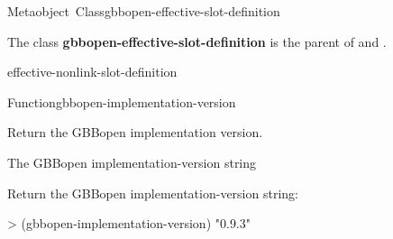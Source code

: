 \documentclass[10pt,twoside,english,pdftex]{article}
\begin{document}
\begin{functiondoc}{Metaobject~Class}{gbbopen-effective-slot-definition}{}
%

\fnsyntax

\fnpackage {}

\fnmodule {}

\fndescription The class \textbf{gbbopen-effective-slot-definition} is the
parent  of \textbf{} and
\textbf{}.
 
\begin{alsos}{effective-nonlink-slot-definition}
\end{alsos}

\end{functiondoc}


\begin{functiondoc}{Function}{gbbopen-implementation-version}{\noargs{}
    \returns{} }
%
%

\fnsyntax

\fnpurpose Return the GBBopen implementation version.

\fnpackage {}

\fnmodule {}

\fnreturns The GBBopen implementation-version string

\fnexample
Return the GBBopen implementation-version string:
%
\W\supp
\begin{example}
> (gbbopen-implementation-version)
"0.9.3"
\end{example}

\end{functiondoc}

\end{document}
